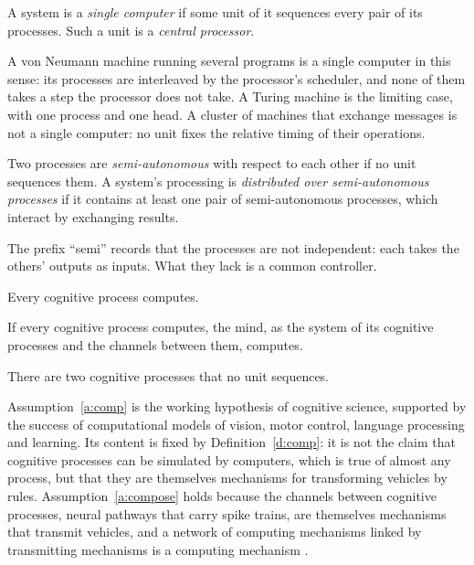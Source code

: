 \documentclass{situationist-preprint}
\begin{document}
\begin{definition}\label{d:single}
A system is a \emph{single computer} if some unit of it sequences every pair of its processes. Such a unit is a \emph{central processor}.
\end{definition}

A von Neumann machine running several programs is a single computer in this sense: its processes are interleaved by the processor's scheduler, and none of them takes a step the processor does not take. A Turing machine is the limiting case, with one process and one head. A cluster of machines that exchange messages is not a single computer: no unit fixes the relative timing of their operations.

\begin{definition}\label{d:semi}
Two processes are \emph{semi-autonomous} with respect to each other if no unit sequences them. A system's processing is \emph{distributed over semi-autonomous processes} if it contains at least one pair of semi-autonomous processes, which interact by exchanging results.
\end{definition}

The prefix \enquote{semi} records that the processes are not independent: each takes the others' outputs as inputs. What they lack is a common controller.

\begin{assumption}[Computation]\label{a:comp}
Every cognitive process computes.
\end{assumption}

\begin{assumption}[Composition]\label{a:compose}
If every cognitive process computes, the mind, as the system of its cognitive processes and the channels between them, computes.
\end{assumption}

\begin{assumption}[Dissociation]\label{a:diss}
There are two cognitive processes that no unit sequences.
\end{assumption}

Assumption~\ref{a:comp} is the working hypothesis of cognitive science, supported by the success of computational models of vision, motor control, language processing and learning. Its content is fixed by Definition~\ref{d:comp}: it is not the claim that cognitive processes can be simulated by computers, which is true of almost any process, but that they are themselves mechanisms for transforming vehicles by rules. Assumption~\ref{a:compose} holds because the channels between cognitive processes, neural pathways that carry spike trains, are themselves mechanisms that transmit vehicles, and a network of computing mechanisms linked by transmitting mechanisms is a computing mechanism \citep{Piccinini2015}.
\end{document}
